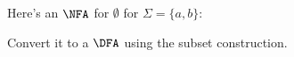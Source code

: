 Here's an $\NFA$ for $\emptyset$ for $\Sigma = \{a,b\}$:

Convert it to a $\DFA$ using the subset construction.
